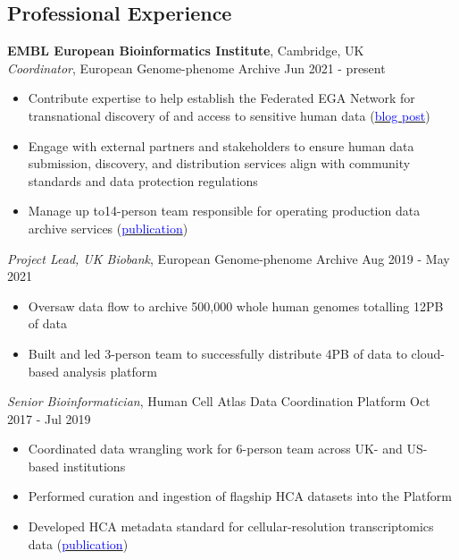 \documentclass[margin,line]{res}
\begin{document}
\begin{resume}
\section{\sc Professional Experience}
{\bf EMBL European Bioinformatics Institute}, Cambridge, UK\\
{\em Coordinator}, European Genome-phenome Archive \hfill {Jun 2021 - present}
\begin{itemize}
\itemsep0em 
	\item Contribute expertise to help establish the Federated EGA Network for transnational discovery of and access to sensitive human data (\href{https://ega-archive.org/blog/safe-access-to-sensitive-human-data-across-borders-federated-ega/}{\textcolor{blue}{blog post}})
	\item Engage with external partners and stakeholders to ensure human data submission, discovery, and distribution services align with community standards and data protection regulations
	\item Manage up to14-person team responsible for operating production data archive services (\href{https://doi.org/10.1093/nar/gkab1059}{\textcolor{blue}{publication}})
\end{itemize}

{\em Project Lead, UK Biobank}, European Genome-phenome Archive \hfill {Aug 2019 - May 2021}
\begin{itemize}
\itemsep0em 
	\item Oversaw data flow to archive 500,000 whole human genomes totalling 12PB of data
	\item Built and led 3-person team to successfully distribute 4PB of data to cloud-based analysis platform
\end{itemize}

{\em Senior Bioinformatician}, Human Cell Atlas Data Coordination Platform \hfill {Oct 2017 - Jul 2019}
\begin{itemize}
\itemsep0em 
	\item Coordinated data wrangling work for 6-person team across UK- and US-based institutions
	\item Performed curation and ingestion of flagship HCA datasets into the Platform
	\item Developed HCA metadata standard for cellular-resolution transcriptomics data (\href{https://doi.org/10.1038/s41587-020-00744-z}{\textcolor{blue}{publication}})
\end{itemize}


\end{resume}
\end{document}
